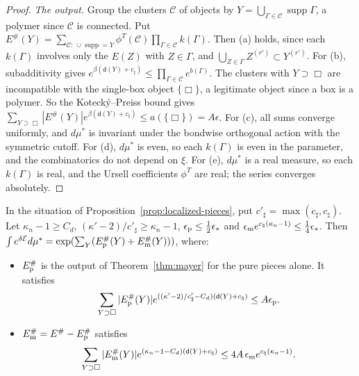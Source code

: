 \begin{proof}
\emph{The output.} Group the clusters $\mathcal C$ of objects by $Y=\bigcup_{\Gamma\in\mathcal C}\operatorname{supp}\Gamma$, a polymer since $\mathcal C$ is connected. Put $E^\#(Y)=\sum_{\mathcal C:\,\cup\operatorname{supp}=Y}\phi^T(\mathcal C)\prod_{\Gamma\in\mathcal C}k(\Gamma)$. Then (a) holds, since each $k(\Gamma)$ involves only the $E(Z)$ with $Z\in\Gamma$, and $\bigcup_{Z\in\Gamma}Z^{(r')}\subset Y^{(r')}$. For (b), subadditivity gives $e^{\beta(\mathsf d(Y)+c_\natural)}\le\prod_{\Gamma\in\mathcal C}e^{b(\Gamma)}$. The clusters with $Y\supset\Box$ are incompatible with the single-box object $\{\Box\}$, a legitimate object since a box is a polymer. So the Koteck\'y--Preiss bound gives $\sum_{Y\supset\Box}|E^\#(Y)|e^{\beta(\mathsf d(Y)+c_\natural)}\le a(\{\Box\})=A\epsilon$. For (c), all sums converge uniformly, and $d\mu^*$ is invariant under the bondwise orthogonal action with the symmetric cutoff. For (d), $d\mu^*$ is even, so each $k(\Gamma)$ is even in the parameter, and the combinatorics do not depend on $\xi$. For (e), $d\mu^*$ is a real measure, so each $k(\Gamma)$ is real, and the Ursell coefficients $\phi^T$ are real; the series converges absolutely.
\end{proof}

\begin{corollary}\label{cor:two-classes}
In the situation of Proposition~\ref{prop:localized-pieces}, put $c'_\sharp=\max(c_\sharp,c_\natural)$. Let $\kappa_n-1\ge C_d$, $(\kappa'-2)/c'_\sharp\ge\kappa_n-1$, $\epsilon_{\rm p}\le\frac12\epsilon_*$ and $\epsilon_{\rm m}e^{c_\natural(\kappa_n-1)}\le\frac14\epsilon_*$. Then $\int e^{\delta\mathcal E}d\mu^*=\exp(\sum_Y(E^\#_{\rm p}(Y)+E^\#_{\rm m}(Y)))$, where:
\begin{itemize}
\item $E^\#_{\rm p}$ is the output of Theorem~\ref{thm:mayer} for the pure pieces alone. It satisfies
\[
\sum_{Y\supset\Box}|E^\#_{\rm p}(Y)|e^{((\kappa'-2)/c'_\sharp-C_d)(\mathsf d(Y)+c_\natural)}\le A\epsilon_{\rm p} .
\]
\item $E^\#_{\rm m}=E^\#-E^\#_{\rm p}$ satisfies
\[
\sum_{Y\supset\Box}|E^\#_{\rm m}(Y)|e^{(\kappa_n-1-C_d)(\mathsf d(Y)+c_\natural)}\le4A\,\epsilon_{\rm m}e^{c_\natural(\kappa_n-1)} .
\]
\end{itemize}
\end{corollary}

